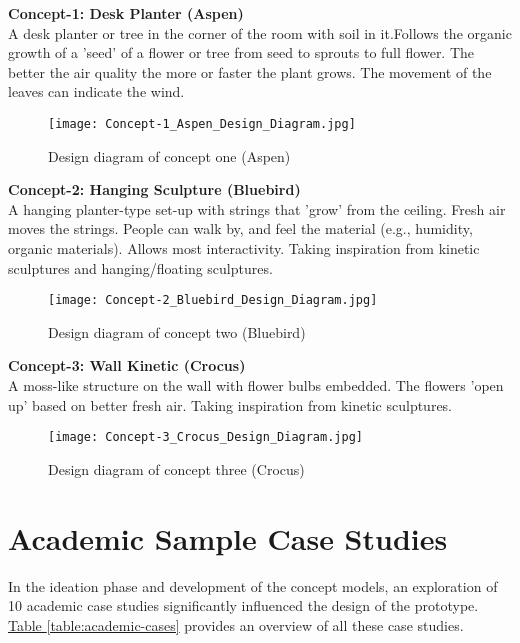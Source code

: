 \begin{appendices}
\vspace{1em}

\textbf{Concept-1: Desk Planter (Aspen)}\\
A desk planter or tree in the corner of the room with soil in it.Follows the organic growth of a 'seed' of a flower or tree from seed to sprouts to full flower. The better the air quality the more or faster the plant grows. The movement of the leaves can indicate the wind.


\begin{figure}[H]
    \centering
    \texttt{[image: Concept-1\_Aspen\_Design\_Diagram.jpg]}
    \caption{Design diagram of concept one (Aspen)}
    \label{fig:concept-one}
\end{figure}

\textbf{Concept-2: Hanging Sculpture (Bluebird)}\\
A hanging planter-type set-up with strings that 'grow' from the ceiling. Fresh air moves the strings. People can walk by, and feel the material (e.g., humidity, organic materials). Allows most interactivity. Taking inspiration from kinetic sculptures and hanging/floating sculptures.

\begin{figure}[H]
    \centering
    \texttt{[image: Concept-2\_Bluebird\_Design\_Diagram.jpg]}
    \caption{Design diagram of concept two (Bluebird)}
    \label{fig:concept-two}
\end{figure}

\newpage

\textbf{Concept-3: Wall Kinetic (Crocus)} \\
A moss-like structure on the wall with flower bulbs embedded. The flowers 'open up' based on better fresh air. Taking inspiration from kinetic sculptures.

\begin{figure}[H]
    \centering
    \texttt{[image: Concept-3\_Crocus\_Design\_Diagram.jpg]}
    \caption{Design diagram of concept three (Crocus)}
    \label{fig:concept-three}
\end{figure}

\section{Academic Sample Case Studies}
\label{appendix:academic}

In the ideation phase and development of the concept models, an exploration of 10 academic case studies significantly influenced the design of the prototype. \hyperref[table:academic-cases]{Table \ref{table:academic-cases}} provides an overview of all these case studies.


\end{appendices}

